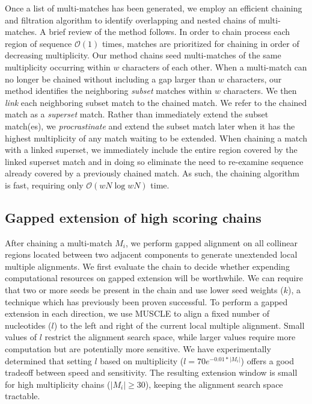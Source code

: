 \documentclass{ws-procs975x65}
\begin{document}
Once a list of multi-matches has been generated, we employ an efficient chaining and filtration algorithm to identify overlapping and nested chains of multi-matches\cite{ref-procrast}. A brief review of the method follows.
In order to chain process each region of sequence $\mathcal{O}(1)$ times, matches are prioritized for chaining in order of decreasing multiplicity.  Our method chains seed multi-matches of the same multiplicity occurring within $w$
characters of each other.
When a multi-match can no
longer be chained without including a gap larger than $w$
characters, our method identifies the neighboring \textit{subset}
matches within $w$ characters. We then \textit{link} each
neighboring subset match to the chained match. We refer to the
chained match as a \textit{superset} match. Rather than immediately
extend the subset match(es), we \textit{procrastinate} and extend
the subset match later when it has the highest multiplicity of any
match waiting to be extended. When chaining a match with a linked
superset, we immediately include the entire region covered by the linked superset
match and in doing so eliminate the need to re-examine sequence already covered by
a previously chained match.  As such, the chaining algorithm is fast, requiring only $\mathcal{O}(wN \log wN)$ time.

\subsection{Gapped extension of high scoring chains}

After chaining a multi-match $M_i$, we perform gapped alignment on all collinear regions located between two adjacent components to generate unextended local multiple alignments. We first evaluate the chain to decide whether expending computational resources on gapped extension will be worthwhile. We can require that two or more seeds be present in the chain and use lower seed weights ($k$), a technique which has previously been proven successful\cite{ref-blastz,ref-gappedblast,ref-blat}.  To perform a gapped extension in each direction, we use MUSCLE to align a fixed number of nucleotides ($l$) to the left and right of the current local multiple alignment.
Small values of $l$ restrict the alignment search space, while larger values require more computation but are potentially more sensitive.  We have experimentally determined that setting $l$ based on multiplicity ($l = 70e^{-0.01*|M_{i}|}$) offers a good tradeoff between speed and sensitivity.  The resulting extension window is small for high multiplicity chains ($|M_{i}|\geq 30$), keeping the alignment search space tractable.
\end{document}
